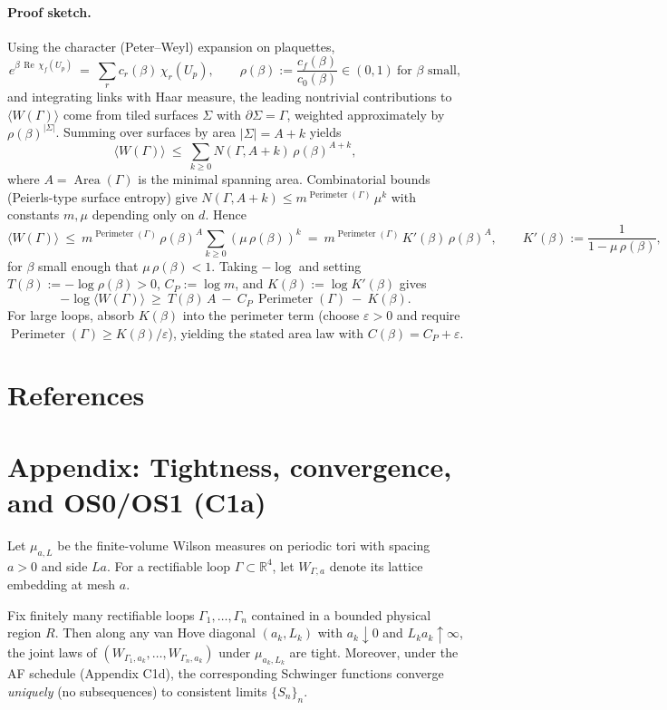 \documentclass[11pt]{amsart}
\begin{document}
\paragraph{Proof sketch.}
Using the character (Peter–Weyl) expansion on plaquettes,
\[
  e^{\beta\,\operatorname{Re}\,\chi_f(U_p)}\ =\ \sum_r c_r(\beta)\,\chi_r(U_p),\qquad \rho(\beta):=\frac{c_f(\beta)}{c_0(\beta)}\in(0,1)\ \text{for $\beta$ small},
\]
and integrating links with Haar measure, the leading nontrivial contributions to $\langle W(\Gamma)\rangle$ come from tiled surfaces $\Sigma$ with $\partial\Sigma=\Gamma$, weighted approximately by $\rho(\beta)^{|\Sigma|}$. Summing over surfaces by area $|\Sigma|=A+k$ yields
\[
  \langle W(\Gamma)\rangle\ \le\ \sum_{k\ge 0} N(\Gamma,A+k)\, \rho(\beta)^{A+k},
\]
where $A=\operatorname{Area}(\Gamma)$ is the minimal spanning area. Combinatorial bounds (Peierls-type surface entropy) give $N(\Gamma,A+k)\le m^{\operatorname{Perimeter}(\Gamma)}\,\mu^k$ with constants $m,\mu$ depending only on $d$. Hence
\[
  \langle W(\Gamma)\rangle\ \le\ m^{\operatorname{Perimeter}(\Gamma)}\, \rho(\beta)^A \sum_{k\ge 0} (\mu\,\rho(\beta))^k
  \ =\ m^{\operatorname{Perimeter}(\Gamma)}\,K'(\beta)\,\rho(\beta)^A,\qquad K'(\beta):=\frac{1}{1-\mu\,\rho(\beta)},
\]
for $\beta$ small enough that $\mu\,\rho(\beta)<1$. Taking $-\log$ and setting $T(\beta):=-\log\rho(\beta)>0$, $C_P:=\log m$, and $K(\beta):=\log K'(\beta)$ gives
\[
  -\log\langle W(\Gamma)\rangle\ \ge\ T(\beta)\,A\ -\ C_P\,\operatorname{Perimeter}(\Gamma)\ -\ K(\beta).
\]
For large loops, absorb $K(\beta)$ into the perimeter term (choose $\varepsilon>0$ and require $\operatorname{Perimeter}(\Gamma)\ge K(\beta)/\varepsilon$), yielding the stated area law with $C(\beta)=C_P+\varepsilon$.

\section{References}

\section{Appendix: Tightness, convergence, and OS0/OS1 (C1a)}

Let $\mu_{a,L}$ be the finite-volume Wilson measures on periodic tori with spacing $a>0$ and side $L a$. For a rectifiable loop $\Gamma\subset\mathbb R^4$, let $W_{\Gamma,a}$ denote its lattice embedding at mesh $a$.

\begin{theorem}\label{thm:c1a-tight}
Fix finitely many rectifiable loops $\Gamma_1,\dots,\Gamma_n$ contained in a bounded physical region $R$. Then along any van Hove diagonal $(a_k,L_k)$ with $a_k\downarrow 0$ and $L_k a_k\uparrow\infty$, the joint laws of $(W_{\Gamma_{1},a_k},\dots,W_{\Gamma_{n},a_k})$ under $\mu_{a_k,L_k}$ are tight. Moreover, under the AF schedule (Appendix C1d), the corresponding Schwinger functions converge \emph{uniquely} (no subsequences) to consistent limits $\{S_n\}_n$.
\end{theorem}
\end{document}
